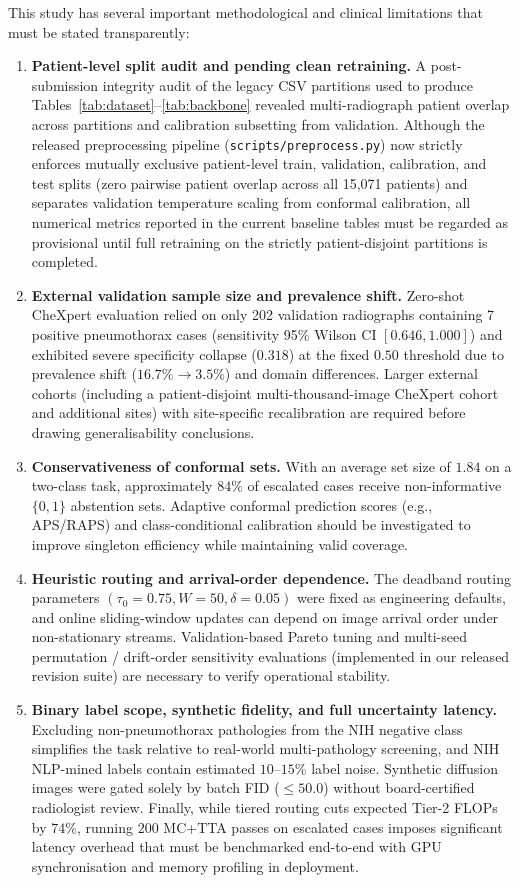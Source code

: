 \documentclass[diagnostics,article,submit,moreauthors]{Definitions/mdpi}
\newcommand{\rev}[1]{#1}
\begin{document}
This study has several important methodological and clinical limitations that must be stated transparently:
\begin{enumerate}
\item \rev{\textbf{Patient-level split audit and pending clean retraining.} A post-submission integrity audit of the legacy CSV partitions used to produce Tables~\ref{tab:dataset}--\ref{tab:backbone} revealed multi-radiograph patient overlap across partitions and calibration subsetting from validation. Although the released preprocessing pipeline (\texttt{scripts/preprocess.py}) now strictly enforces mutually exclusive patient-level train, validation, calibration, and test splits (zero pairwise patient overlap across all 15,071 patients) and separates validation temperature scaling from conformal calibration, all numerical metrics reported in the current baseline tables must be regarded as provisional until full retraining on the strictly patient-disjoint partitions is completed.}
\item \rev{\textbf{External validation sample size and prevalence shift.} Zero-shot CheXpert evaluation relied on only 202 validation radiographs containing 7 positive pneumothorax cases (sensitivity 95\% Wilson CI $[0.646, 1.000]$) and exhibited severe specificity collapse ($0.318$) at the fixed $0.50$ threshold due to prevalence shift ($16.7\% \to 3.5\%$) and domain differences. Larger external cohorts (including a patient-disjoint multi-thousand-image CheXpert cohort and additional sites) with site-specific recalibration are required before drawing generalisability conclusions.}
\item \rev{\textbf{Conservativeness of conformal sets.} With an average set size of $1.84$ on a two-class task, approximately $84\%$ of escalated cases receive non-informative $\{0,1\}$ abstention sets. Adaptive conformal prediction scores (e.g., APS/RAPS) and class-conditional calibration should be investigated to improve singleton efficiency while maintaining valid coverage.}
\item \rev{\textbf{Heuristic routing and arrival-order dependence.} The deadband routing parameters $(\tau_0=0.75, W=50, \delta=0.05)$ were fixed as engineering defaults, and online sliding-window updates can depend on image arrival order under non-stationary streams. Validation-based Pareto tuning and multi-seed permutation / drift-order sensitivity evaluations (implemented in our released revision suite) are necessary to verify operational stability.}
\item \rev{\textbf{Binary label scope, synthetic fidelity, and full uncertainty latency.} Excluding non-pneumothorax pathologies from the NIH negative class simplifies the task relative to real-world multi-pathology screening, and NIH NLP-mined labels contain estimated $10$--$15\%$ label noise. Synthetic diffusion images were gated solely by batch FID ($\le 50.0$) without board-certified radiologist review. Finally, while tiered routing cuts expected Tier-2 FLOPs by $74\%$, running $200$ MC+TTA passes on escalated cases imposes significant latency overhead that must be benchmarked end-to-end with GPU synchronisation and memory profiling in deployment.}
\end{enumerate}
\end{document}
